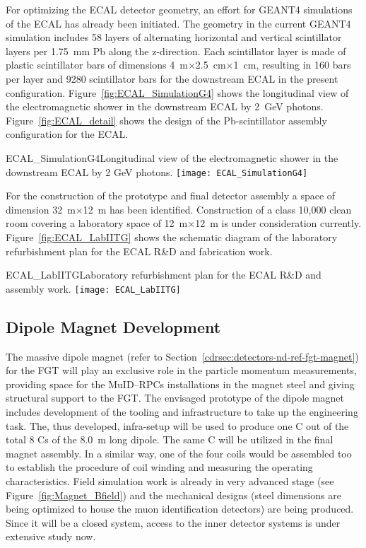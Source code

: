For optimizing the ECAL detector geometry, an effort for GEANT4
simulations of the ECAL has already been initiated. The geometry in
the current GEANT4 simulation includes 58 layers of alternating
horizontal and vertical scintillator layers per 1.75~mm Pb along the
z-direction. Each scintillator layer is made of plastic scintillator
bars of dimensions 4~m$\times$2.5~cm$\times$1~cm, resulting in 160
bars per layer and 9280 scintillator bars for the downstream ECAL in
the present configuration.  Figure~\ref{fig:ECAL_SimulationG4} shows
the longitudinal view of the electromagnetic shower in the downstream
ECAL by 2~GeV photons. Figure~\ref{fig:ECAL_detail} shows the design
of the Pb-scintillator assembly configuration for the ECAL.
\begin{cdrfigure}  
{ECAL_SimulationG4}{Longitudinal view of the electromagnetic shower in 
the downstream ECAL by 2 GeV photons.}  
\texttt{[image: ECAL\_SimulationG4]}
\end{cdrfigure}

For the construction of the prototype and final detector assembly a
space of dimension 32~m$\times$12~m has been
identified. Construction of a class 10,000 clean room covering a
laboratory space of 12~m$\times$12~m is under consideration
currently. Figure~\ref{fig:ECAL_LabIITG} shows the schematic diagram
of the laboratory refurbishment plan for the ECAL R\&D and fabrication
work.
\begin{cdrfigure}  
{ECAL_LabIITG}{Laboratory refurbishment plan for the ECAL R\&D and assembly work.}  
\texttt{[image: ECAL\_LabIITG]}
\end{cdrfigure}


\subsection{Dipole Magnet Development} 

The massive dipole magnet (refer to
Section~\ref{cdrsec:detectors-nd-ref-fgt-magnet}) for the FGT will
play an exclusive role in the particle momentum measurements,
providing space for the MuID--RPCs installations in the magnet steel
and giving structural support to the FGT. The envisaged prototype of
the dipole magnet includes development of the tooling and
infrastructure to take up the engineering task.  The, thus developed,
infra-setup will be used to produce one C out of the total 8 Cs of the
8.0~m long dipole.  The same C will be utilized in the final magnet
assembly. In a similar way, one of the four coils would be assembled
too to establish the procedure of coil winding and measuring the
operating characteristics.  Field simulation work is already in very
advanced stage (see Figure~\ref{fig:Magnet_Bfield}) and the mechanical
designs (steel dimensions are being optimized to house the muon
identification detectors) are being produced.  Since it will be a
closed system, access to the inner detector systems is under extensive
study now.




